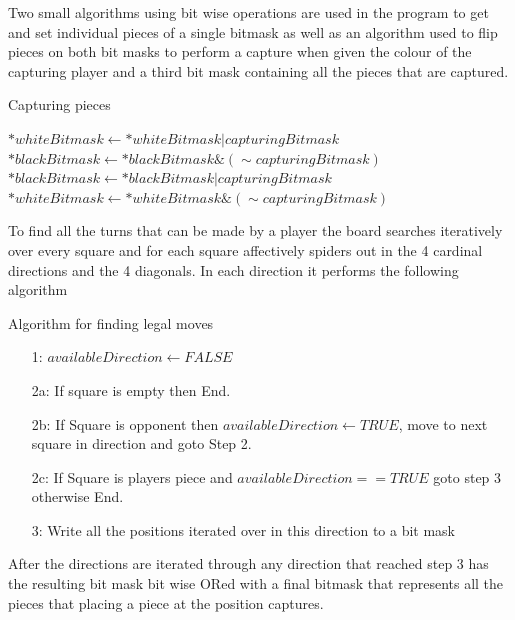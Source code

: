 \documentclass[final]{cmpreport}
\begin{document}
Two small algorithms using bit wise operations are used in the program to get and set individual pieces of a single bitmask as well as an algorithm used to flip pieces on both bit masks to perform a capture when given the colour of the capturing player and a third bit mask containing all the pieces that are captured.
\begin{cmpfigure}[htb]{Capturing pieces}
	\begin{algorithmic}
		\State $*whiteBitmask \gets *whiteBitmask | capturingBitmask$
		\State $*blackBitmask \gets *blackBitmask \& (\sim capturingBitmask)$
		\EndIf
		\State $*blackBitmask \gets *blackBitmask | capturingBitmask$
		\State $*whiteBitmask \gets *whiteBitmask \& (\sim capturingBitmask)$
		\EndIf
		\EndFunction
	\end{algorithmic}
\end{cmpfigure} 
\FloatBarrier

To find all the turns that can be made by a player the board searches iteratively over every square and for each square affectively spiders out in the 4 cardinal directions and the 4 diagonals. In each direction it performs the following algorithm
\begin{cmpfigure}[htb]{Algorithm for finding legal moves\label{legal}}
	\begin{enumerate}
		\item[1:] $availableDirection \gets FALSE$
		\item[2a:] If square is empty then End.
		\item[2b:] If Square is opponent then $availableDirection \gets TRUE$, move to next square in direction and goto Step 2. 
		\item[2c:] If Square is players piece and $availableDirection == TRUE$ goto step 3 otherwise End.
		\item[3:] Write all the positions iterated over in this direction to a bit mask
	\end{enumerate}
\end{cmpfigure}
\FloatBarrier

After the directions are iterated through any direction that reached step 3 has the resulting bit mask bit wise ORed with a final bitmask that represents all the pieces that placing a piece at the position captures.
\end{document}
